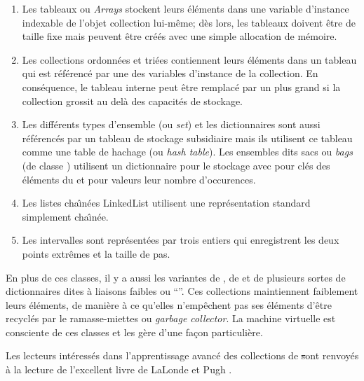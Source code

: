 \documentclass[a4paper,10pt,twoside]{book}
\begin{document}
\begin{enumerate}
  \item Les tableaux ou \emph{Arrays} stockent leurs \'el\'ements dans une
variable d'instance indexable de l'objet collection lui-m\^eme; 
d\`es lors, les tableaux doivent \^etre de taille fixe mais peuvent \^etre
cr\'e\'es avec une simple allocation de m\'emoire.
  \item Les collections ordonn\'ees  et tri\'ees 
 contiennent leurs \'el\'ements dans un tableau
qui est r\'ef\'erenc\'e par une des variables d'instance de la collection.
En cons\'equence, le tableau interne peut \^etre remplac\'e par un 
plus grand si la collection grossit au del\`a des capacit\'es de 
stockage.
  \item Les diff\'erents types d'ensemble (ou \emph{set}) et les dictionnaires
sont aussi r\'ef\'erenc\'es par un tableau de stockage subsidiaire
mais ils utilisent ce tableau comme une table de hachage (ou \emph{hash table}). Les ensembles dits sacs ou \emph{bags} (de classe ) utilisent
un dictionnaire  pour le stockage avec pour cl\'es
des \'el\'ements du  et pour valeurs leur nombre d'occurences.
  \item Les listes cha\^{\i}n\'ees LinkedList utilisent une
repr\'esentation standard simplement cha\^{\i}n\'ee.
  \item Les intervalles  sont repr\'esent\'ees 
par trois entiers qui enregistrent les deux points extr\^emes et la taille de pas.
\end{enumerate}
En plus de ces classes, il y a aussi les variantes de \mbox{,} de  et de plusieurs sortes de dictionnaires dites \`a liaisons faibles ou ``''. Ces collections maintiennent faiblement leurs \'el\'ements, \ie de mani\`ere \`a ce qu'elles n'emp\^echent pas ses \'el\'ements d'\^etre
recycl\'es par le ramasse-miettes ou \emph{garbage collector}.
La machine virtuelle \pharo est consciente de ces classes et les g\`ere d'une
fa\c{c}on particuli\`ere.

Les lecteurs int\'eress\'es dans l'apprentissage avanc\'e des collections
de \st sont renvoy\'es \`a la lecture de l'excellent livre de LaLonde et Pugh
\cite{LaLo90a}.
\end{document}
